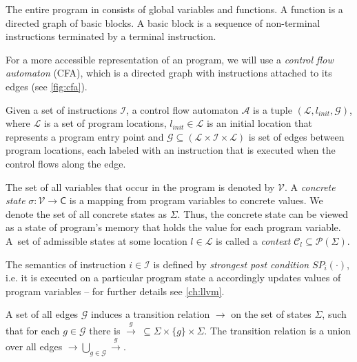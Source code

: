 The entire program in \llvm consists of global variables and functions.  A
function is a directed graph of basic blocks. A basic block is a sequence of
non-terminal instructions terminated by a terminal instruction.

For a more accessible representation of an \llvm program, we will use a
\emph{control flow automaton} (CFA), which is a directed graph with \llvm
instructions attached to its edges (see \autoref{fig:cfa}).

\begin{definition}
    Given a set of instructions $\mathcal{I}$, a control flow automaton
    $\mathcal{A}$ is a tuple $(\mathcal{L}, l_{\textit{init}}, \mathcal{G})$,
    where $\mathcal{L}$ is a set of program locations, $l_{\textit{init}} \in
    \mathcal{L}$ is an initial location that represents a program entry point
    and $\mathcal{G} \subseteq (\mathcal{L} \times \mathcal{I} \times
    \mathcal{L})$ is set of edges between program locations, each labeled with
    an instruction that is executed when the control flows along the edge.
\end{definition}

The set of all variables that occur in the \llvm program is denoted by
$\mathcal{V}$. A \emph{concrete state} $\sigma : \mathcal{V} \rightarrow
\mathsf{C}$ is a mapping from program variables to concrete values. We denote
the set of all concrete states as $\Sigma$. Thus, the concrete state can be
viewed as a state of program's memory that holds the value for each program
variable. A~set of admissible states at some location $l \in \mathcal{L}$ is
called a \emph{context} $\mathcal{C}_l \subseteq \mathcal{P}(\Sigma)$.

The semantics of instruction $i \in \mathcal{I}$ is defined by \emph{strongest
post condition} $SP_{i}(\cdot)$, i.e. it is executed on a particular program
state a accordingly updates values of program variables -- for further details
see \autoref{ch:llvm}.

A set of all edges $\mathcal{G}$ induces a transition relation $\rightarrow$ on
the set of states $\Sigma$, such that for each $g \in \mathcal{G}$ there is
$\xrightarrow{g} \: \subseteq \Sigma \times \{g\} \times \Sigma$. The
transition relation is a union over all edges $\rightarrow \bigcup_{g
\in\mathcal{G}} \xrightarrow{g}$.

